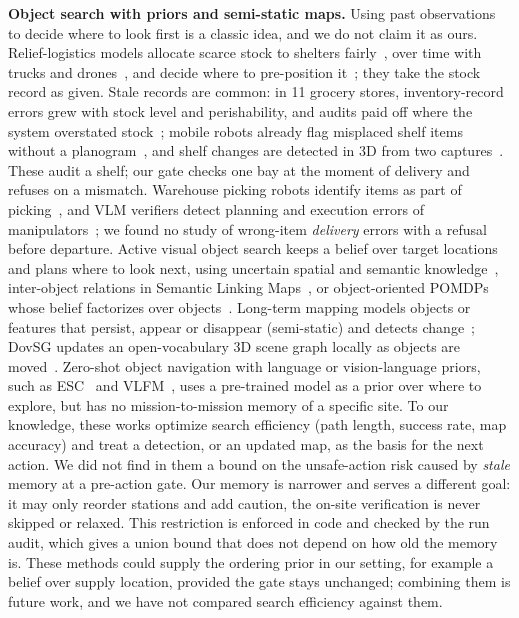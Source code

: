 \documentclass[conference]{IEEEtran}
\begin{document}
\textbf{Object search with priors and semi-static maps.} Using past observations to decide where to look first is a classic idea, and we do not claim it as ours. Relief-logistics models allocate scarce stock to shelters fairly~\cite{mostajabdaveh2025equitable}, over time with trucks and drones~\cite{vansteenbergen2023reliefuav}, and decide where to pre-position it~\cite{shehadeh2020prepositioning}; they take the stock record as given. Stale records are common: in 11 grocery stores, inventory-record errors grew with stock level and perishability, and audits paid off where the system overstated stock~\cite{rekik2025inventoryerror}; mobile robots already flag misplaced shelf items without a planogram~\cite{kapoor2023coad}, and shelf changes are detected in 3D from two captures~\cite{zhou2026shelfchange3d}. These audit a shelf; our gate checks one bay at the moment of delivery and refuses on a mismatch. Warehouse picking robots identify items as part of picking~\cite{correll2016apc}, and VLM verifiers detect planning and execution errors of manipulators~\cite{pacaud2025guardian}; we found no study of wrong-item \emph{delivery} errors with a refusal before departure. Active visual object search keeps a belief over target locations and plans where to look next, using uncertain spatial and semantic knowledge~\cite{aydemir2013active}, inter-object relations in Semantic Linking Maps~\cite{zeng2020slim}, or object-oriented POMDPs whose belief factorizes over objects~\cite{wandzel2019mos}. Long-term mapping models objects or features that persist, appear or disappear (semi-static) and detects change~\cite{mason2012objectworld,rosen2016lifelong}; DovSG updates an open-vocabulary 3D scene graph locally as objects are moved~\cite{yan2025dovsg}. Zero-shot object navigation with language or vision-language priors, such as ESC~\cite{zhou2023esc} and VLFM~\cite{yokoyama2024vlfm}, uses a pre-trained model as a prior over where to explore, but has no mission-to-mission memory of a specific site. To our knowledge, these works optimize search efficiency (path length, success rate, map accuracy) and treat a detection, or an updated map, as the basis for the next action. We did not find in them a bound on the unsafe-action risk caused by \emph{stale} memory at a pre-action gate. Our memory is narrower and serves a different goal: it may only reorder stations and add caution, the on-site verification is never skipped or relaxed. This restriction is enforced in code and checked by the run audit, which gives a union bound that does not depend on how old the memory is. These methods could supply the ordering prior in our setting, for example a belief over supply location, provided the gate stays unchanged; combining them is future work, and we have not compared search efficiency against them.
\end{document}
